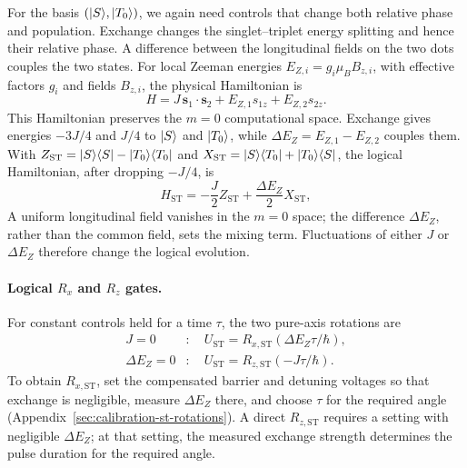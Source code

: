 For the basis $(\lvert S\rangle,\lvert T_0\rangle)$, we again need controls that
change both relative phase and population.
Exchange changes the singlet--triplet energy splitting and hence
their relative phase. A difference between the longitudinal fields
on the two dots couples the two states.
For local Zeeman energies $E_{Z,i}=g_i\mu_B B_{z,i}$,
with effective factors $g_i$ and fields $B_{z,i}$, the physical
Hamiltonian is
\begin{equation}
  H=J\,\mathbf{s}_1\cdot\mathbf{s}_2
    +E_{Z,1}s_{1z}+E_{Z,2}s_{2z}.
  \label{eq:st-physical-hamiltonian}
\end{equation}
This Hamiltonian preserves the $m=0$ computational space.
Exchange gives energies $-3J/4$ and $J/4$ to $\lvert S\rangle$ and $\lvert T_0\rangle$,
while $\Delta E_Z=E_{Z,1}-E_{Z,2}$ couples them.
With $Z_{\mathrm{ST}}=\lvert S\rangle\langle S\rvert-\lvert T_0\rangle\langle T_0\rvert$ and
$X_{\mathrm{ST}}=\lvert S\rangle\langle T_0\rvert+\lvert T_0\rangle\langle S\rvert$,
the logical Hamiltonian, after dropping $-J/4$, is
\begin{equation}
  H_{\mathrm{ST}}=-\frac{J}{2}Z_{\mathrm{ST}}
                   +\frac{\Delta E_Z}{2}X_{\mathrm{ST}},
  \label{eq:st-effective-hamiltonian}
\end{equation}
A uniform longitudinal field vanishes in the $m=0$ space; the
difference $\Delta E_Z$, rather than the common field, sets the
mixing term. Fluctuations of either $J$ or $\Delta E_Z$ therefore
change the logical evolution.

\paragraph{Logical \texorpdfstring{$R_x$ and $R_z$}{Rx and Rz} gates.}
For constant controls held for a time $\tau$, the two pure-axis
rotations are
\begin{equation}
  \begin{aligned}
   J=0 &: \quad U_{\mathrm{ST}}=R_{x,\mathrm{ST}}(\Delta E_Z\tau/\hbar),\\
   \Delta E_Z=0 &: \quad U_{\mathrm{ST}}=R_{z,\mathrm{ST}}(-J\tau/\hbar).
  \end{aligned}
  \label{eq:st-axis-limits}
\end{equation}
To obtain $R_{x,\mathrm{ST}}$, set the compensated barrier and detuning
voltages so that exchange is negligible, measure $\Delta E_Z$
there, and choose $\tau$ for the required angle
(Appendix~\ref{sec:calibration-st-rotations}). A direct
$R_{z,\mathrm{ST}}$ requires a setting with negligible
$\Delta E_Z$; at that setting, the measured exchange strength
determines the pulse duration for the required angle.

